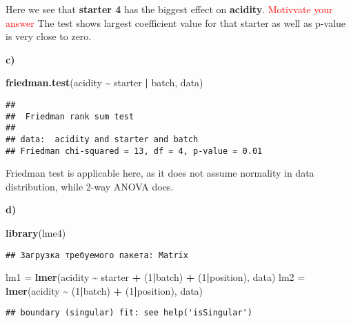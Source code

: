 \documentclass[
]{article}
\newenvironment{Shaded}{\begin{snugshade}}{\end{snugshade}}
\newcommand{\DecValTok}[1]{\textcolor[rgb]{0.00,0.00,0.81}{#1}}
\newcommand{\FunctionTok}[1]{\textcolor[rgb]{0.13,0.29,0.53}{\textbf{#1}}}
\newcommand{\NormalTok}[1]{#1}
\newcommand{\OtherTok}[1]{\textcolor[rgb]{0.56,0.35,0.01}{#1}}
\newcommand{\SpecialCharTok}[1]{\textcolor[rgb]{0.81,0.36,0.00}{\textbf{#1}}}
\begin{document}
Here we see that \textbf{starter 4} has the biggest effect on
\textbf{acidity}. \textcolor{red}{Motivvate your answer} The test shows
largest coefficient value for that starter as well as p-value is very
close to zero.

\textbf{c)}

\begin{Shaded}
\begin{Highlighting}[]
\FunctionTok{friedman.test}\NormalTok{(acidity }\SpecialCharTok{\textasciitilde{}}\NormalTok{ starter }\SpecialCharTok{|}\NormalTok{ batch, data)}
\end{Highlighting}
\end{Shaded}

\begin{verbatim}
## 
##  Friedman rank sum test
## 
## data:  acidity and starter and batch
## Friedman chi-squared = 13, df = 4, p-value = 0.01
\end{verbatim}

Friedman test is applicable here, as it does not assume normality in
data distribution, while 2-way ANOVA does.

\textbf{d)}

\begin{Shaded}
\begin{Highlighting}[]
\FunctionTok{library}\NormalTok{(lme4)}
\end{Highlighting}
\end{Shaded}

\begin{verbatim}
## Загрузка требуемого пакета: Matrix
\end{verbatim}

\begin{Shaded}
\begin{Highlighting}[]
\NormalTok{lm1 }\OtherTok{=} \FunctionTok{lmer}\NormalTok{(acidity }\SpecialCharTok{\textasciitilde{}}\NormalTok{ starter }\SpecialCharTok{+}\NormalTok{ (}\DecValTok{1}\SpecialCharTok{|}\NormalTok{batch) }\SpecialCharTok{+}\NormalTok{ (}\DecValTok{1}\SpecialCharTok{|}\NormalTok{position), data)}
\NormalTok{lm2 }\OtherTok{=} \FunctionTok{lmer}\NormalTok{(acidity }\SpecialCharTok{\textasciitilde{}}\NormalTok{ (}\DecValTok{1}\SpecialCharTok{|}\NormalTok{batch) }\SpecialCharTok{+}\NormalTok{ (}\DecValTok{1}\SpecialCharTok{|}\NormalTok{position), data)}
\end{Highlighting}
\end{Shaded}

\begin{verbatim}
## boundary (singular) fit: see help('isSingular')
\end{verbatim}
\end{document}
